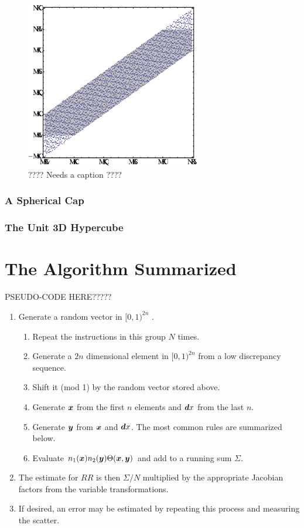 \documentclass[usenatbib]{mn2e}
\begin{document}
\begin{figure}
\includegraphics[width=3in]{plots/grid1d-4}
\caption{???? Needs a caption ????}
\label{fig:grid1d}
\end{figure}

\subsubsection{A Spherical Cap}

\subsubsection{The Unit 3D Hypercube}

\section{The Algorithm Summarized}
\label{sec:alg}

PSEUDO-CODE HERE?????
\begin{enumerate}
  \item Generate a random vector in $[0,1)^{2n}$ .
  \begin{enumerate}
    \item Repeat the instructions in this group $N$ times.
    \item Generate a $2n$ dimensional element in $[0,1)^{2n}$ from a low
    discrepancy sequence.
    \item Shift it (mod 1) by the random vector stored above.
    \item Generate ${\bm x}$ from the first $n$ elements and ${\bm dx}$ from the last
    $n$.
    \item Generate ${\bm y}$ from ${\bm x}$ and ${\bm dx}$. The most common rules are
    summarized below.
    \item Evaluate $n_1({\bm x}) n_2({\bm y}) \Theta({\bm x}, {\bm y})$ and add to a running sum
    $\Sigma$.
  \end{enumerate}
  \item The estimate for $RR$ is then $\Sigma/N$ multiplied by the appropriate
  Jacobian factors from the variable transformations. 
  \item If desired, an error may be estimated by repeating this process and
  measuring the scatter. 
\end{enumerate}
\end{document}
